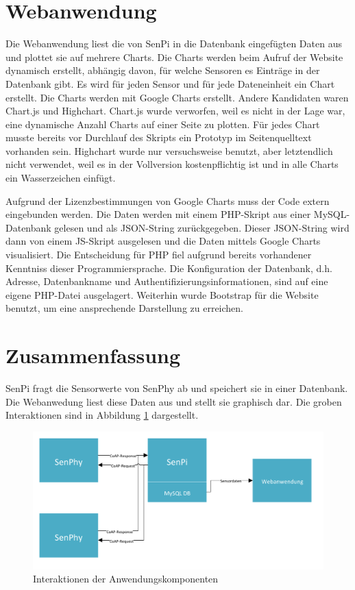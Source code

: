 \documentclass[a4paper]{article}
\begin{document}
\section{Webanwendung}
Die Webanwendung liest die von SenPi in die Datenbank eingefügten Daten aus und plottet sie auf mehrere Charts. Die Charts werden beim Aufruf der Website dynamisch erstellt, abhängig davon, für welche Sensoren es Einträge in der Datenbank gibt. Es wird für jeden Sensor und für jede Dateneinheit ein Chart erstellt. Die Charts werden mit Google Charts erstellt. Andere Kandidaten waren Chart.js und Highchart. Chart.js wurde verworfen, weil es nicht in der Lage war, eine dynamische Anzahl Charts auf einer Seite zu plotten. Für jedes Chart musste bereits vor Durchlauf des Skripts ein Prototyp im Seitenquelltext vorhanden sein. Highchart wurde nur versuchsweise benutzt, aber letztendlich nicht verwendet, weil es in der Vollversion kostenpflichtig ist und in alle Charts ein Wasserzeichen einfügt.

Aufgrund der Lizenzbestimmungen von Google Charts muss der Code extern eingebunden werden. Die Daten werden mit einem PHP-Skript aus einer MySQL-Datenbank gelesen und als JSON-String zurückgegeben. Dieser JSON-String wird dann von einem JS-Skript ausgelesen und die Daten mittels Google Charts visualisiert. Die Entscheidung für PHP fiel aufgrund bereits vorhandener Kenntniss dieser Programmiersprache. Die Konfiguration der Datenbank, d.h. Adresse, Datenbankname und Authentifizierungsinformationen, sind auf eine eigene PHP-Datei ausgelagert. Weiterhin wurde Bootstrap für die Website benutzt, um eine ansprechende Darstellung zu erreichen.

\section{Zusammenfassung}
SenPi fragt die Sensorwerte von SenPhy ab und speichert sie in einer Datenbank. Die Webanwedung liest diese Daten aus und stellt sie graphisch dar. Die groben Interaktionen sind in Abbildung \ref{fig:interacion} dargestellt.
\begin{figure}[h]
\centering
\includegraphics[scale=0.7]{interactionDiagram.pdf}
\caption{\label{fig:interacion}Interaktionen der Anwendungskomponenten}
\end{figure}
\end{document}
